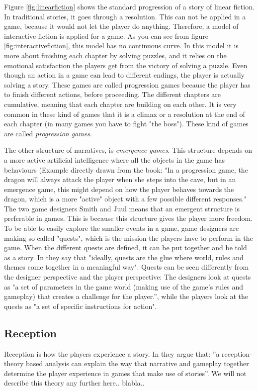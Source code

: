Figure \ref{fig:linearfiction} shows the standard progression of a story of linear fiction. In traditional stories, it goes through a resolution. This can not be applied in a game, because it would not let the player do anything. Therefore, a model of interactive fiction is applied for a game. As you can see from figure \ref{fig:interactivefiction}, this model has no continuous curve. In this model it is more about finishing each chapter by solving puzzles, and it relies on the emotional satisfaction the players get from the victory of solving a puzzle. Even though an action in a game can lead to different endings, the player is actually solving a story. These games are called progression games because the player has to finish different actions, before proceeding. The different chapters are cumulative, meaning that each chapter are building on each other. It is very common in these kind of games that it is a climax or a resolution at the end of each chapter (in many games you have to fight "the boss"). These kind of games are called \emph{progression games}. 

The other structure of narratives, is \emph{emergence games}. This structure depends on a more active artificial intelligence where all the objects in the game has behaviours (Example directly drawn from the book: "In a progression game, the dragon will always attack the player when she steps into the cave, but in an emergence game, this might depend on how the player behaves towards the dragon, which is a more "active" object with a few possible different responses." The two game designers Smith and Juul means that an emergent structure is preferable in games. This is because this structure gives the player more freedom. To be able to easily explore the smaller events in a game, game designers are making so called "quests", which is the mission the players have to perform in the game. When the different quests are defined, it can be put together and be told as a story. In \cite{understandingvg} they say that "ideally, quests are the glue where world, rules and themes come together in a meaningful way". Quests can be seen differently from the designer perspective and the player perspective: The designers look at quests as "a set of parameters in the game world (making use of the game’s rules and gameplay) that creates a challenge for the player.”, while the players look at the quests as "a set of specific instructions for action". 

\subsection{Reception}
Reception is how the players experience a story. In \cite{understandingvg} they argue that: ”a reception-theory based analysis can explain the way that narrative and gameplay together determine the player experience in games that make use of stories”. We will not describe this theory any further here.. blabla.. 

